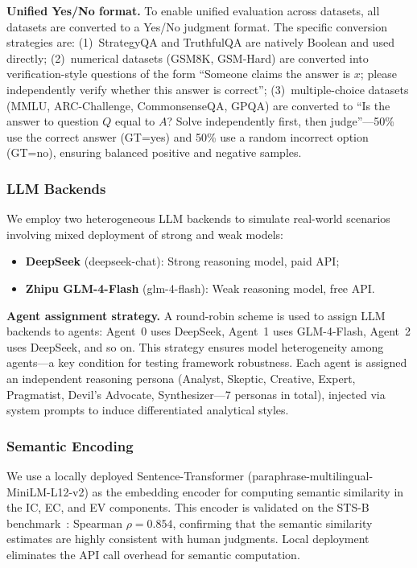 \documentclass[12pt,a4paper]{article}
\begin{document}
\textbf{Unified Yes/No format.} To enable unified evaluation across datasets, all datasets are converted to a Yes/No judgment format. The specific conversion strategies are: (1)~StrategyQA and TruthfulQA are natively Boolean and used directly; (2)~numerical datasets (GSM8K, GSM-Hard) are converted into verification-style questions of the form ``Someone claims the answer is $x$; please independently verify whether this answer is correct''; (3)~multiple-choice datasets (MMLU, ARC-Challenge, CommonsenseQA, GPQA) are converted to ``Is the answer to question $Q$ equal to $A$? Solve independently first, then judge''---50\% use the correct answer (GT=yes) and 50\% use a random incorrect option (GT=no), ensuring balanced positive and negative samples.

\subsubsection{LLM Backends}

We employ two heterogeneous LLM backends to simulate real-world scenarios involving mixed deployment of strong and weak models:
\begin{itemize}[nosep]
    \item \textbf{DeepSeek} (deepseek-chat): Strong reasoning model, paid API;
    \item \textbf{Zhipu GLM-4-Flash} (glm-4-flash): Weak reasoning model, free API.
\end{itemize}

\textbf{Agent assignment strategy.} A round-robin scheme is used to assign LLM backends to agents: Agent~0 uses DeepSeek, Agent~1 uses GLM-4-Flash, Agent~2 uses DeepSeek, and so on. This strategy ensures model heterogeneity among agents---a key condition for testing framework robustness. Each agent is assigned an independent reasoning persona (Analyst, Skeptic, Creative, Expert, Pragmatist, Devil's Advocate, Synthesizer---7 personas in total), injected via system prompts to induce differentiated analytical styles.

\subsubsection{Semantic Encoding}

We use a locally deployed Sentence-Transformer (paraphrase-multilingual-MiniLM-L12-v2) as the embedding encoder for computing semantic similarity in the IC, EC, and EV components. This encoder is validated on the STS-B benchmark~\cite{reimers2019sentence}: Spearman $\rho = 0.854$, confirming that the semantic similarity estimates are highly consistent with human judgments. Local deployment eliminates the API call overhead for semantic computation.
\end{document}
